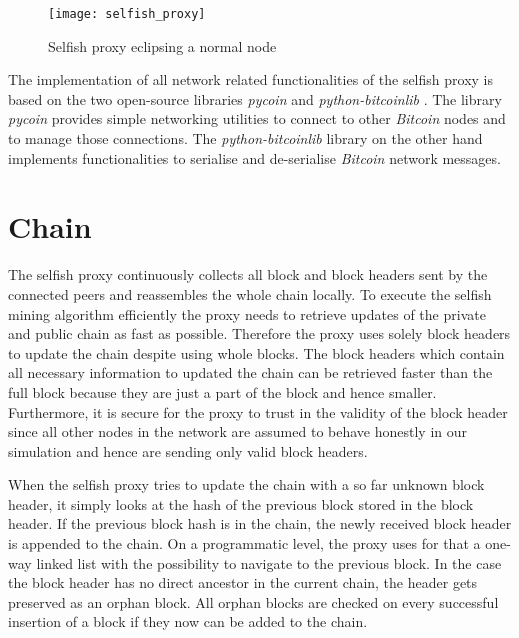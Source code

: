 \begin{figure}
	\centering
    \texttt{[image: selfish\_proxy]}
    \caption{Selfish proxy eclipsing a normal node}
    \label{fig:selfish_proxy}
\end{figure}

The implementation of all network related functionalities of the selfish proxy is based on the two open-source libraries \textit{pycoin} \cite{pycoin} and \textit{python-bitcoinlib} \cite{python-bitcoinlib}.
The library \textit{pycoin} provides simple networking utilities to connect to other \textit{Bitcoin} nodes and to manage those connections. 
The \textit{python-bitcoinlib} library on the other hand implements functionalities to serialise and de-serialise \textit{Bitcoin} network messages.

\section{Chain}

The selfish proxy continuously collects all block and block headers sent by the connected peers and reassembles the whole chain locally.
To execute the selfish mining algorithm efficiently the proxy needs to retrieve updates of the private and public chain as fast as possible.
Therefore the proxy uses solely block headers to update the chain despite using whole blocks.
The block headers which contain all necessary information to updated the chain can be retrieved faster than the full block because they are just a part of the block and hence smaller.
Furthermore, it is secure for the proxy to trust in the validity of the block header since all other nodes in the network are assumed to behave honestly in our simulation and hence are sending only valid block headers.

When the selfish proxy tries to update the chain with a so far unknown block header, it simply looks at the hash of the previous block stored in the block header.
If the previous block hash is in the chain, the newly received block header is appended to the chain.
On a programmatic level, the proxy uses for that a one-way linked list with the possibility to navigate to the previous block.
In the case the block header has no direct ancestor in the current chain, the header gets preserved as an orphan block.
All orphan blocks are checked on every successful insertion of a block if they now can be added to the chain.

